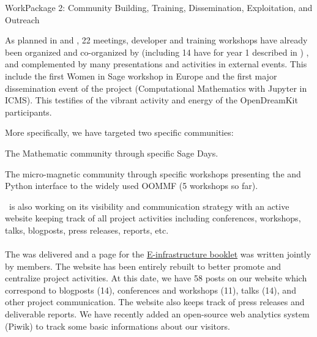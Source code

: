 \documentclass{deliverablereport}
\makeatletter
\renewcommand\subsubsection{\@startsection{subsubsection}{2}%
  \z@{.5\linespacing\@plus.7\linespacing}{.1\linespacing}%
  {\normalfont\bfseries}}
\makeatother
\begin{document}
\clearpage
  \subsubsection{WorkPackage 2:  Community Building, Training, Dissemination, Exploitation, and Outreach}
\label{dissem}

  As planned in  and
  , 22 meetings, developer and training workshops have already
  been organized and co-organized by \ODK (including 14 have for year 1 described in ) , and complemented by many
  presentations and activities in external events. This include the first Women in Sage workshop in Europe and the
  first major dissemination event of the project (Computational Mathematics with Jupyter in ICMS). This testifies
  of the vibrant activity and energy of the OpenDreamKit participants.
  
  More specifically, we have targeted two specific communities:

\begin{compactitem}
\item The Mathematic community through specific Sage Days.
\item The micro-magnetic community through specific workshops presenting
the \Jupyter and Python interface to the widely used OOMMF  (5 workshops so far).
\end{compactitem}  
  

  \ODK\ is also working on its visibility and communication strategy with an active website keeping track of all
  project activities including conferences, workshops, talks, blogposts, press releases, reports, etc.
  
\paragraph{}

The  was delivered and a page for the \href{https://github.com/OpenDreamKit/OpenDreamKit/blob/master/Communication/eInfra-Booklet/ODK.md}{E-infrastructure booklet} was written jointly by \ODK members. The website has been 
entirely rebuilt to better promote  and centralize project activities. At this date, 
we have 58 posts on our website which correspond to blogposts (14), conferences and workshops (11),
talks (14), and other project communication. The website also keeps track of press releases
and deliverable reports. We have recently added an open-source web analytics system (Piwik) 
to track some basic informations about our visitors.
\end{document}
